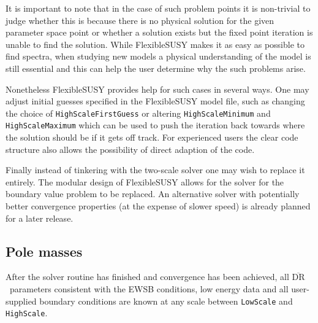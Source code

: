 \documentclass[final,3p,11pt,pdflatex]{elsarticle}
\makeatletter
\newcommand{\fs}{FlexibleSUSY\@\xspace}
\newcommand{\code}[1]{\lstinline|#1|}  %
\newcommand{\textoverline}[1]{$\overline{\mbox{#1}}$}
\newcommand{\DRbar}{\textoverline{DR}\xspace}
\makeatother
\begin{document}
It is important to note that in the case of such problem points it is
non-trivial to judge whether this is because there is no physical
solution for the given parameter space point or whether a solution
exists but the fixed point iteration is unable to find the solution.
While \fs makes it as easy as possible to find spectra, when studying
new models a physical understanding of the model is still essential
and this can help the user determine why the such problems arise.

Nonetheless \fs provides help for such cases in several ways. One may
adjust initial guesses specified in the \fs model file, such
as changing the choice of \code{HighScaleFirstGuess} or altering
\code{HighScaleMinimum} and \code{HighScaleMaximum} which can be used
to push the iteration back towards where the solution should be if it
gets off track. For experienced users the clear code structure also allows the
possibility of direct adaption of the code. 

Finally instead of tinkering with the two-scale solver one may wish to
replace it entirely. The modular design of \fs allows for the
solver for the boundary value problem to be replaced. An alternative
solver with potentially better convergence properties (at the expense of slower
speed) is already planned for a later release.

\subsection{Pole masses}
\label{sec:PoleMasses}
After the solver routine has finished and convergence has been
achieved, all \DRbar\ parameters consistent with the EWSB conditions,
low energy data and all user-supplied boundary conditions are
known at any scale between \code{LowScale} and \code{HighScale}.
\end{document}
